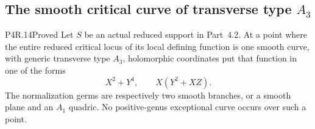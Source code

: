 \subsection{The smooth critical curve of transverse type \texorpdfstring{$A_3$}{A3}}

\begin{statement}{P4R.14}{Proved}
Let $S$ be an actual reduced support in Part~4.2. At a point
where the entire reduced critical locus of its local defining
function is one smooth curve, with generic transverse type
$A_3$, holomorphic coordinates put that function in one of
the forms
\[
 X^2+Y^4,\qquad X(Y^2+XZ).                              \tag{P4R.14.1}
\]
The normalization germs are respectively two smooth branches,
or a smooth plane and an $A_1$ quadric. No positive-genus
exceptional curve occurs over such a point.
\end{statement}
